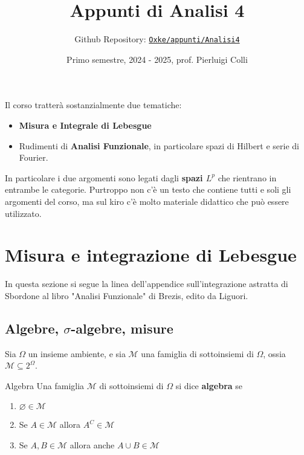 
\title{Appunti di Analisi 4}
\author{Github Repository:
\href{https://github.com/Oxke/appunti/tree/main/Analisi4}{\texttt{Oxke/appunti/Analisi4}}}
\date{Primo semestre, 2024 \-- 2025, prof. Pierluigi Colli}

\maketitle

Il corso tratterà sostanzialmente due tematiche:
\begin{itemize}[label = --]
    \item \textbf{Misura e Integrale di Lebesgue}
    \item Rudimenti di \textbf{Analisi Funzionale}, in particolare spazi di Hilbert e serie di Fourier.
\end{itemize}
In particolare i due argomenti sono legati dagli \textbf{spazi \(L^{p}\)} che rientrano in entrambe
le categorie.
Purtroppo non c'è un testo che contiene tutti e soli gli argomenti del corso, ma
sul kiro c'è molto materiale didattico che può essere utilizzato.
\tableofcontents
\newpage

\section{Misura e integrazione di Lebesgue}
In questa sezione si segue la linea dell'appendice sull'integrazione astratta di
Sbordone al libro "Analisi Funzionale" di Brezis, edito da Liguori.

\subsection{Algebre, \(\sigma\)-algebre, misure}
Sia \(\Omega\) un insieme ambiente, e sia \(\mathcal{M}\) una famiglia di
sottoinsiemi di \(\Omega\), ossia \(\mathcal{M} \subseteq 2^{\Omega} \).
\begin{definition}{Algebra}
    Una famiglia \(\mathcal{M}\) di sottoinsiemi di \(\Omega\) si dice
    \textbf{algebra} se
\begin{enumerate}[label = \arabic*.]
    \item \(\varnothing \in \mathcal{M} \) 
    \item Se \(A \in \mathcal{M}\) allora \(A^{C} \in \mathcal{M}\) 
    \item Se \(A, B \in \mathcal{M}\) allora anche \(A \cup B \in \mathcal{M}\) 
\end{enumerate}
\end{definition}

